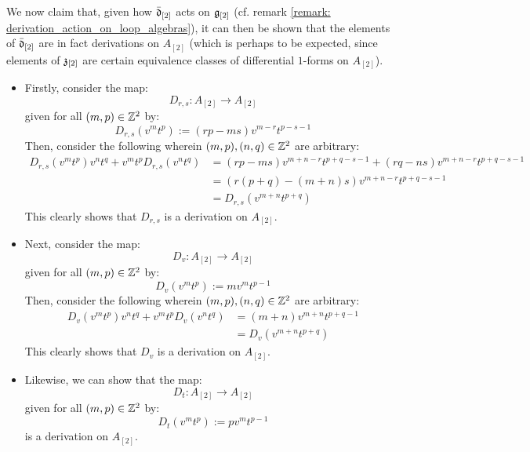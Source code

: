             \begin{remark} \label{remark: dual_of_toroidal_centres_contains_derivations}
                We now claim that, given how $\bar{\mathfrak{d}}_{[2]}$ acts on $\mathfrak{g}_{[2]}$ (cf. remark \ref{remark: derivation_action_on_loop_algebras}), it can then be shown that the elements of $\bar{\mathfrak{d}}_{[2]}$ are in fact derivations on $A_{[2]}$ (which is perhaps to be expected, since elements of $\mathfrak{z}_{[2]}$ are certain equivalence classes of differential $1$-forms on $A_{[2]}$).
                \begin{itemize}
                    \item Firstly, consider the map:
                        $$D_{r, s}: A_{[2]} \to A_{[2]}$$
                    given for all $(m, p) \in \mathbb{Z}^2$ by:
                        $$D_{r, s}(v^m t^p) := ( rp - ms ) v^{m - r} t^{p - s - 1}$$
                    Then, consider the following wherein $(m, p), (n, q) \in \mathbb{Z}^2$ are arbitrary:
                        $$
                            \begin{aligned}
                                D_{r, s}(v^m t^p) v^n t^q + v^m t^p D_{r, s}(v^n t^q) & = ( rp - ms ) v^{m + n - r} t^{p + q - s - 1} + ( rq - ns ) v^{m + n - r} t^{p + q - s - 1}
                                \\
                                & = ( r(p + q) - (m + n)s ) v^{m + n - r} t^{p + q - s - 1}
                                \\
                                & = D_{r, s}( v^{m + n} t^{p + q} )
                            \end{aligned}
                        $$
                    This clearly shows that $D_{r, s}$ is a derivation on $A_{[2]}$.
                    \item Next, consider the map:
                        $$D_v: A_{[2]} \to A_{[2]}$$
                    given for all $(m, p) \in \mathbb{Z}^2$ by:
                        $$D_v(v^m t^p) := m v^m t^{p - 1}$$
                    Then, consider the following wherein $(m, p), (n, q) \in \mathbb{Z}^2$ are arbitrary:
                        $$
                            \begin{aligned}
                                D_v(v^m t^p) v^n t^q + v^m t^p D_v(v^n t^q) & = (m + n) v^{m + n} t^{p + q - 1}
                                \\
                                & = D_v( v^{m + n} t^{p + q} )
                            \end{aligned}
                        $$
                    This clearly shows that $D_v$ is a derivation on $A_{[2]}$.
                    \item Likewise, we can show that the map:
                        $$D_t: A_{[2]} \to A_{[2]}$$
                    given for all $(m, p) \in \mathbb{Z}^2$ by:
                        $$D_t(v^m t^p) := p v^m t^{p - 1}$$
                    is a derivation on $A_{[2]}$.
                \end{itemize}


\end{remark}
